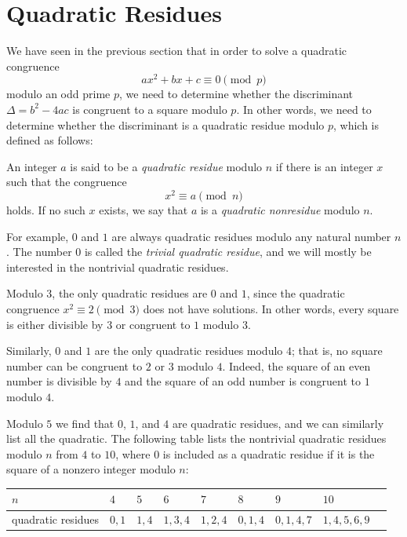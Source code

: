 \section{Quadratic Residues}

We have seen in the previous section that in order to solve a quadratic congruence
\begin{equation*}
  ax^2 + bx + c \equiv 0 \pmod{p}
\end{equation*}
modulo an odd prime $p$, we need to determine whether the discriminant $\Delta=b^2-4ac$ is congruent to a square modulo $p$. In other words, we need to determine whether the discriminant is a quadratic residue modulo $p$, which is defined as follows:

\begin{definition}
  An integer $a$ is said to be a \emph{quadratic residue} modulo $n$ if there is an integer $x$ such that the congruence
  \begin{equation*}
    x^2\equiv a\pmod{n}
  \end{equation*}
  holds. If no such $x$ exists, we say that $a$ is a \emph{quadratic nonresidue} modulo $n$.
\end{definition}

For example, $0$ and $1$ are always quadratic residues modulo any natural number $n$. The number $0$ is called the \emph{trivial quadratic residue}, and we will mostly be interested in the nontrivial quadratic residues.

Modulo $3$, the only quadratic residues are $0$ and $1$, since the quadratic congruence $x^2\equiv 2\pmod{3}$ does not have solutions. In other words, every square is either divisible by $3$ or congruent to $1$ modulo $3$.

Similarly, $0$ and $1$ are the only quadratic residues modulo $4$; that is, no square number can be congruent to $2$ or $3$ modulo $4$. Indeed, the square of an even number is divisible by $4$ and the square of an odd number is congruent to $1$ modulo $4$.

Modulo $5$ we find that $0$, $1$, and $4$ are quadratic residues, and we can similarly list all the quadratic. The following table lists the nontrivial quadratic residues modulo $n$ from $4$ to $10$, where $0$ is included as a quadratic residue if it is the square of a nonzero integer modulo $n$:
\begin{center}
  \begin{tabular}{lllllllll}
    $n$ & $4$ & $5$ & $6$ & $7$ & $8$ & $9$ & $10$ \\ \midrule
    quadratic residues & $0,1$ & $1,4$ & $1,3,4$ & $1,2,4$ & $0,1,4$ & $0,1,4,7$ & $1,4,5,6,9$
  \end{tabular}
\end{center}

